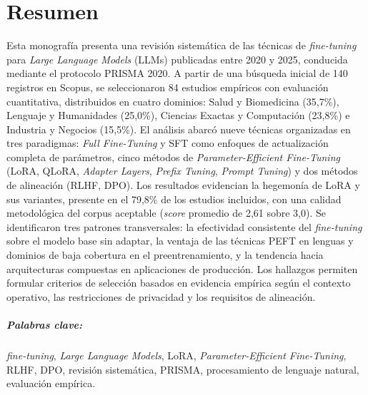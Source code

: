 \chapter{Resumen}
Esta monografía presenta una revisión sistemática de las técnicas de \textit{fine-tuning} para \textit{Large Language Models} (LLMs) publicadas entre 2020 y 2025, conducida mediante el protocolo PRISMA 2020. A partir de una búsqueda inicial de 140 registros en Scopus, se seleccionaron 84 estudios empíricos con evaluación cuantitativa, distribuidos en cuatro dominios: Salud y Biomedicina (35,7\%), Lenguaje y Humanidades (25,0\%), Ciencias Exactas y Computación (23,8\%) e Industria y Negocios (15,5\%). El análisis abarcó nueve técnicas organizadas en tres paradigmas: \textit{Full Fine-Tuning} y SFT como enfoques de actualización completa de parámetros, cinco métodos de \textit{Parameter-Efficient Fine-Tuning} (LoRA, QLoRA, \textit{Adapter Layers}, \textit{Prefix Tuning}, \textit{Prompt Tuning}) y dos métodos de alineación (RLHF, DPO). Los resultados evidencian la hegemonía de LoRA y sus variantes, presente en el 79,8\% de los estudios incluidos, con una calidad metodológica del corpus aceptable (\textit{score} promedio de 2,61 sobre 3,0). Se identificaron tres patrones transversales: la efectividad consistente del \textit{fine-tuning} sobre el modelo base sin adaptar, la ventaja de las técnicas PEFT en lenguas y dominios de baja cobertura en el preentrenamiento, y la tendencia hacia arquitecturas compuestas en aplicaciones de producción. Los hallazgos permiten formular criterios de selección basados en evidencia empírica según el contexto operativo, las restricciones de privacidad y los requisitos de alineación.

\paragraph{Palabras clave:} \textit{fine-tuning}, \textit{Large Language Models}, LoRA, \textit{Parameter-Efficient Fine-Tuning}, RLHF, DPO, revisión sistemática, PRISMA, procesamiento de lenguaje natural, evaluación empírica.

